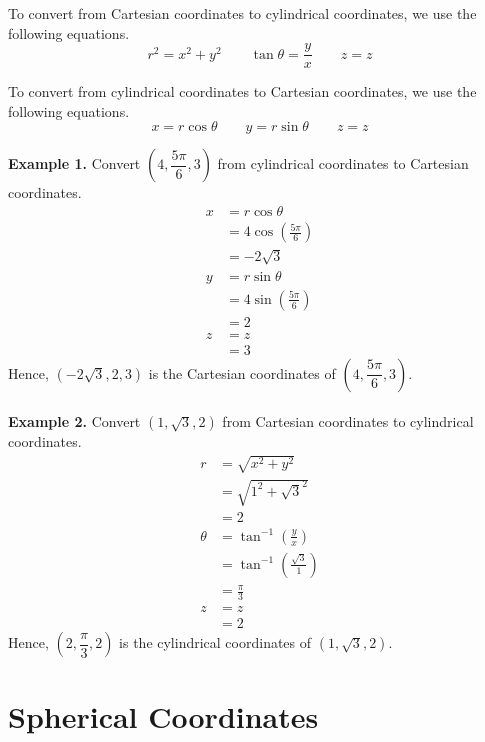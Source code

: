 \documentclass{report}
\begin{document}
To convert from Cartesian coordinates to cylindrical coordinates, we use the
following equations. \[r^2 = x^2 + y^2 \qquad \tan\theta = \frac{y}{x} \qquad z = z\]

To convert from cylindrical coordinates to Cartesian coordinates, we use the
following equations. \[x = r\cos\theta \qquad y = r\sin\theta \qquad z = z\]

\noindent\textbf{Example 1. } Convert $\left(4, \dfrac{5\pi}{6}, 3\right)$ from cylindrical coordinates to Cartesian coordinates.
\begin{align*}
    x & = r\cos\theta                      \\
      & = 4\cos\left(\frac{5\pi}{6}\right) \\
      & = -2\sqrt{3}                       \\
    y & = r\sin\theta                      \\
      & = 4\sin\left(\frac{5\pi}{6}\right) \\
      & = 2                                \\
    z & = z                                \\
      & = 3
\end{align*}
Hence, $\left(-2\sqrt{3}, 2, 3\right)$ is the Cartesian coordinates of $\left(4, \dfrac{5\pi}{6}, 3\right)$.
~\\\\
\noindent\textbf{Example 2. } Convert $\left(1, \sqrt{3}, 2\right)$ from Cartesian coordinates to cylindrical coordinates.
\begin{align*}
    r      & = \sqrt{x^2 + y^2}                         \\
           & = \sqrt{1^2 + \sqrt{3}^2}                  \\
           & = 2                                        \\
    \theta & = \tan^{-1}\left(\frac{y}{x}\right)        \\
           & = \tan^{-1}\left(\frac{\sqrt{3}}{1}\right) \\
           & = \frac{\pi}{3}                            \\
    z      & = z                                        \\
           & = 2
\end{align*}
Hence, $\left(2, \dfrac{\pi}{3}, 2\right)$ is the cylindrical coordinates of $\left(1, \sqrt{3}, 2\right)$.

\chapter{Spherical Coordinates}
\end{document}
